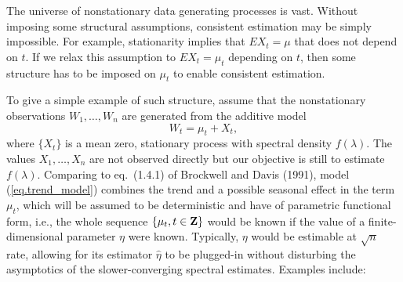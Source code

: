 \documentclass[12p E.Lt,psfig]{article} %
\begin{document}
The universe of nonstationary data generating processes is vast. Without
imposing some  structural  assumptions,  consistent estimation may be
simply impossible. For example, stationarity implies that $EX_t=\mu$
that does not depend on $t$. If we relax this assumption to 
$EX_t=\mu_t$  depending on $t$, then some structure has to be
imposed on $\mu_t$ to enable consistent estimation. 

To give a simple example of such    structure,   assume that the
nonstationary observations
  $W_1,\ldots, W_n$  are generated from the additive model
\begin{equation}
  W_t= \mu_t + X_t,
\label{eq.trend_model}
\end{equation}
where $\{X_t\}$  is a mean zero, stationary process with 
spectral density $f(\lambda)$. The values $X_1,\ldots, X_n$
are not observed directly but our objective is  still to 
estimate  $f(\lambda)$. 
Comparing to eq.~(1.4.1) of Brockwell and Davis (1991), model 
(\ref{eq.trend_model}) combines the trend and a possible seasonal effect
in the term $\mu_t$, which will be assumed to be deterministic and
 have of parametric functional form,
i.e., the whole sequence $\{\mu_t, t\in {\bf Z}\}$  would be known if  the value of
a finite-dimensional parameter $\eta$ were  known.
Typically, $\eta$ would be estimable at   $\sqrt{n}$ rate, allowing for 
 its estimator $\hat \eta$  to be plugged-in without disturbing the
asymptotics of the slower-converging spectral estimates.
Examples include:  
\end{document}
